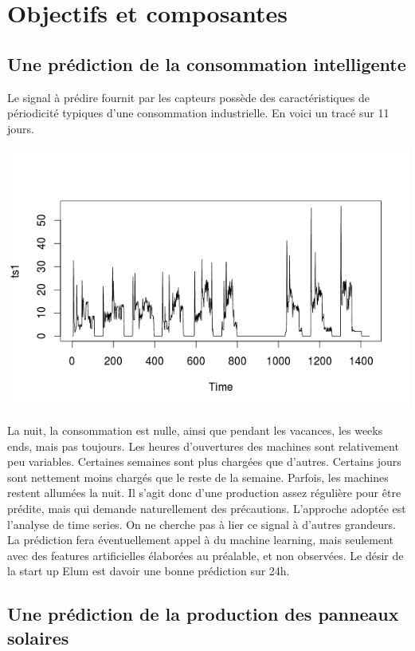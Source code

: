 \documentclass[a4paper]{article}
\begin{document}
\section{Objectifs et composantes}
\begin{multicols}{2}
\subsection{Une prédiction de la consommation intelligente}
Le signal à prédire fournit par les capteurs possède des caractéristiques de périodicité typiques d'une consommation industrielle. En voici un tracé sur 11 jours.

\includegraphics[width=\textwidth/2]{./images/traceconsom.png}

La nuit, la consommation est nulle, ainsi que pendant les vacances, les weeks ends, mais pas toujours. Les heures d'ouvertures des machines sont relativement peu variables. Certaines semaines sont plus chargées que d'autres. Certains jours sont nettement moins chargés que le reste de la semaine. Parfois, les machines restent allumées la nuit. Il s'agit donc d'une production assez régulière pour être prédite, mais qui demande naturellement des précautions.
L'approche adoptée est l'analyse de time series. On ne cherche pas à lier ce signal à d'autres grandeurs. La prédiction fera éventuellement appel à du machine learning, mais seulement avec des features artificielles élaborées au préalable, et non observées.
Le désir de la start up Elum est davoir une bonne prédiction sur 24h.

\subsection{Une prédiction de la production des panneaux solaires}



\end{multicols}
\end{document}
